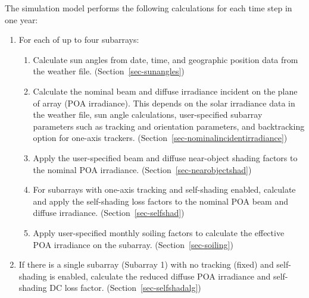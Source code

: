 \documentclass[12pt,letterpaper]{article}
\begin{document}
The simulation model performs the following calculations for each time step in one year:

\begin{enumerate}

\item{For each of up to four subarrays:}

  \begin{enumerate}

  \item{Calculate sun angles from date, time, and geographic position data from the weather file. (Section~\ref{sec-sunangles})} %

  \item{Calculate the nominal beam and diffuse irradiance incident on the plane of array (POA irradiance). This depends on the solar irradiance data in the weather file, sun angle calculations, user-specified subarray parameters such as tracking and orientation parameters, and backtracking option for one-axis trackers. (Section~\ref{sec-nominalincidentirradiance})} %

  \item{Apply the user-specified beam and diffuse near-object shading factors to the nominal POA irradiance. (Section~\ref{sec-nearobjectshad})} %

  \item{For subarrays with one-axis tracking and self-shading enabled, calculate and apply the self-shading loss factors to the nominal POA beam and diffuse irradiance. (Section~\ref{sec-selfshad})} %

  \item{Apply user-specified monthly soiling factors to calculate the effective POA irradiance on the subarray. (Section~\ref{sec-soiling})} %


  \end{enumerate}

\item{If there is a single subarray (Subarray 1) with no tracking (fixed) and self-shading is enabled, calculate the reduced diffuse POA irradiance and self-shading DC loss factor. (Section~\ref{sec-selfshadalg})} %


\end{enumerate}
\end{document}
